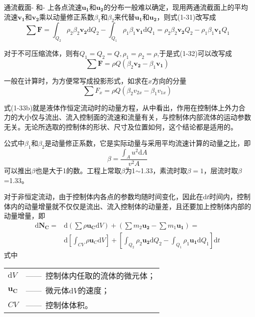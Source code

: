 通流截面\uppercase\expandafter{}-\uppercase\expandafter{}
和\uppercase\expandafter{}-\uppercase\expandafter{}
上各点流速$\boldsymbol{u_1}$和$\boldsymbol{u_2}$的分布一般难以确定，现用两通流截面上的平均流速$\boldsymbol{v_1}$和$\boldsymbol{v_2}$乘以动量修正系数$\beta_1$和$\beta_2$来代替$\boldsymbol{u_1}$和$\boldsymbol{u_2}$，则式(1-31)改写成
\begin{equation}
  \sum \boldsymbol F=\int_{Q_2}\rho_2\beta_2\boldsymbol{v_2}\mathrm{d}Q_2-\int_{Q_1}\rho_1\beta_1\boldsymbol{v_1}\mathrm{d}Q_1=\rho_2\beta_2\boldsymbol{v_2}Q_2-\rho_1\beta_1\boldsymbol{v_1}Q_1
  \end{equation} 

对于不可压缩流体，则有$Q_1=Q_2=Q,\rho_1=\rho_2=\rho$,于是式(1-32)可以改写成
\begin{equation}
  \sum \boldsymbol F=\rho Q(\beta_2\boldsymbol{v_2}-\beta_1\boldsymbol{v_1})
  \end{equation} 

  一般在计算时，为方便常写成投影形式，如求在$x$方向的分量
  \begin{equation}
    \sum F_x=\rho Q(\beta_2 v_{2x}-\beta_1 v_{1x})
    \end{equation} 

    式(1-33b)就是液体作恒定流动时的动量方程，从中看出，作用在控制体上外力合力的大小仅与流出、流入控制面的流速和流量有关，与控制体内部流体的运动参数无关。无论所选取的控制体的形状、尺寸及位置如何，这个结论都是适用的。    

    公式中$\beta_1$和$\beta_2$是动量修正系数，它是实际动量与采用平均流速计算的动量之比，即 
    \begin{equation}
     \beta=\frac{\int_A u^2\mathrm{d}A}{v^2A}
      \end{equation} 
 可以推出$\beta$也是大于1的数。工程上常取$\beta$为1$\sim$1.33，素流时取$\beta=1$，层流时取$\beta$=1.33。

 对于非恒定流动，由于控制体内各点的参数均随时间变化，因此在$\mathrm{d}t$时间内，控制体内的动量增量就不仅仅是流出、流入控制体的动量差，且还要加上控制体内部的动量增量，即
 \begin{equation*}
  \begin{aligned}
  \mathrm{d}\boldsymbol{N_C}=&\mathrm{d}(\sum\rho \boldsymbol{u_C} \mathrm{d}V)+(\sum{m_2\boldsymbol{u_2}}-\sum{m_1\boldsymbol{u_1}})=\\
  &\mathrm{d}[\int_{CV}\rho {\boldsymbol u}_C \mathrm{d}V]+[\int_{Q_2}\rho_2\boldsymbol{u_2}\mathrm{d}Q_2-\int_{Q_1}\rho_1\boldsymbol{u_1}\mathrm{d}Q_1]\mathrm{d}t
\end{aligned}  
\end{equation*} 
\noindent 式中\
\begin{tabular}[t]{ll}
$\mathrm{d}V$&——\ 控制体内任取的流体的微元体；\\
$\boldsymbol{u_C}$&——\ 微元体$\mathrm{d}V$的速度；\\
$CV$&——\ 控制体体积。
\end{tabular}

